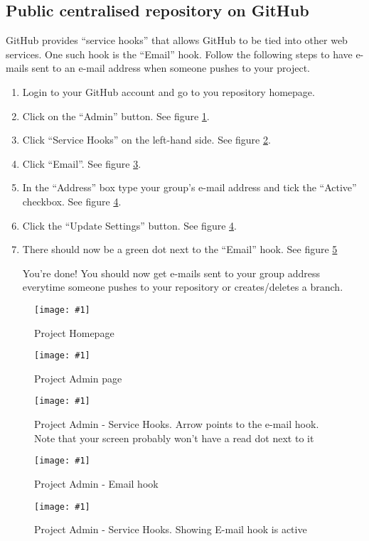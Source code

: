 \documentclass[a4paper,10pt,fleqn]{article}
\newcommand{\screenshot}[3]
{
\begin{figure}[!htbp]
  \centering
  \texttt{[image: \#1]}
   \caption{#2}
  \label{#3}
\end{figure}
}
\begin{document}
\subsection{Public centralised repository on GitHub}
GitHub provides ``service hooks'' that allows GitHub to be tied into other web services. One such hook is the ``Email'' hook. Follow the following steps to have e-mails sent to an e-mail address when someone pushes to your project.

\begin{enumerate}
	\item Login to your GitHub account and go to you repository homepage.
	\item Click on the ``Admin'' button. See figure \ref{fig:screen1}.
	\item Click ``Service Hooks'' on the left-hand side. See figure \ref{fig:screen2}.
	\item Click ``Email''. See figure \ref{fig:screen3}.
	\item In the ``Address'' box type your group's e-mail address and tick the ``Active'' checkbox. See figure \ref{fig:screen4}.
	\item Click the ``Update Settings'' button. See figure \ref{fig:screen4}.
	\item There should now be a green dot next to the ``Email'' hook. See figure \ref{fig:screen5}

You're done! You should now get e-mails sent to your group address everytime someone pushes to your repository or creates/deletes a branch.
\end{enumerate}
\screenshot{gh1.png}{Project Homepage}{fig:screen1}
\screenshot{gh2.png}{Project Admin page}{fig:screen2}
\screenshot{gh3.png}{Project Admin - Service Hooks. Arrow points to the e-mail hook. Note that your screen probably won't have a read dot next to it}{fig:screen3}
\screenshot{gh4.png}{Project Admin - Email hook}{fig:screen4}
\screenshot{gh5.png}{Project Admin - Service Hooks. Showing E-mail hook is active}{fig:screen5}

\pagebreak[4]
\end{document}
